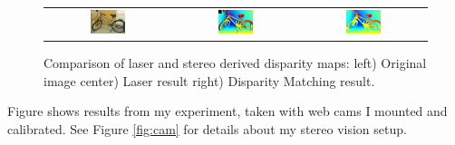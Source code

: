 \documentclass[11pt,fleqn]{article}
\begin{document}
\begin{figure}[!h]
\begin{mdframed}
\centering
\setlength{}
\begin{tabular}{ccc}
\includegraphics[width=0.3\textwidth]{images/_im0-600.jpg} &
\includegraphics[width=0.3\textwidth]{images/disp0GT-600.jpg} &
\includegraphics[width=0.3\textwidth]{images/_disp-600.jpg} \\[2pt]
\end{tabular}
\caption[Comparison of laser and stereo derived disparity maps]{Comparison of laser and stereo derived disparity maps: left) Original image center) Laser result right) Disparity Matching result.}
\label{fig:result1}
\end{mdframed}
\end{figure}

\newpage
Figure \label{fig:image2} shows  results from my experiment, taken with web cams I mounted and calibrated. See Figure \ref{fig:cam} for details about my stereo vision setup.\\
\end{document}
